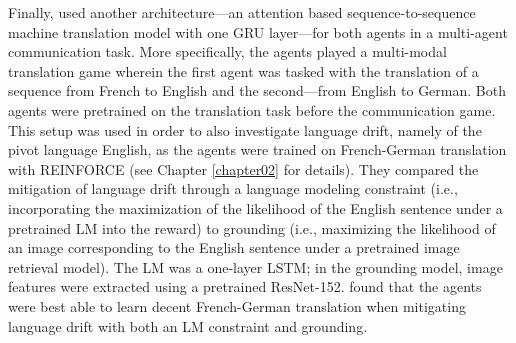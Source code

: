 
Finally, \cite{lee2019countering} used another architecture---an attention based sequence-to-sequence machine translation model with one GRU layer---for both agents in a multi-agent communication task. More specifically, the agents played a multi-modal translation game wherein the first agent was tasked with the translation of a sequence from French to English and the second---from English to German. Both agents were pretrained on the translation task before the communication game. This setup was used in order to also investigate language drift, namely of the pivot language English, as the agents were trained on French-German translation with REINFORCE (see Chapter \ref{chapter02} for details). They compared the mitigation of language drift through a language modeling constraint (i.e., incorporating the maximization of the likelihood of the English sentence under a pretrained LM into the reward) to grounding (i.e., maximizing the likelihood of an image corresponding to the English sentence under a pretrained image retrieval model). The LM was a one-layer LSTM; in the grounding model, image features were extracted using a pretrained ResNet-152. \cite{lee2019countering} found that the agents were best able to learn decent French-German translation when mitigating language drift with both an LM constraint and grounding. 

